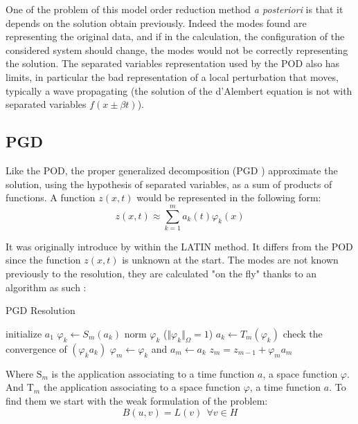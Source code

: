 \documentclass[12pt,a4paper]{article}
\begin{document}
One of the problem of this model order reduction method \textit{a posteriori} is that it depends on the solution obtain previously. Indeed the modes found are representing the original data, and if in the calculation, the configuration of the considered system should change, the modes would not be correctly representing the solution. The separated variables representation used by the POD also has limits, in particular the bad representation of a local perturbation that moves, typically a wave propagating (the solution of the d'Alembert equation is not with separated variables $f(x \pm \beta t )$).


\subsection{PGD}
Like the POD, the proper generalized decomposition (PGD \cite{Multidimensional}) approximate the solution, using the hypothesis of separated variables, as a sum of products of functions. A function $ z(x,t)$ would be represented in the following form:
\begin{equation}
z(x,t) \approx \sum^m_{k=1} a_k(t) \varphi_k(x)
\end{equation}

It was originally introduce by \cite{ladeveze1999nonlinear} within the LATIN method. It differs from the POD since the function $ z(x,t)$ is unknown at the start. The modes are not known previously to the resolution, they are calculated "on the fly" thanks to an algorithm as such :

\begin{center}
\begin{algorithm}
\caption{PGD Resolution}
\begin{algorithmic}[1]
\STATE initialize $a_1$
\STATE $\varphi_k \leftarrow S_m(a_k )$
\STATE norm $\varphi_k$ ($\Vert\varphi_k\Vert_\Omega = 1$)
\STATE $a_k \leftarrow T_m (\varphi_k )$
\STATE check the convergence of $(\varphi_k a_k)$
\ENDFOR
\STATE $\varphi_m \leftarrow \varphi_k$ and $a_m \leftarrow a_k$
\STATE $z_m = z_{m-1} + \varphi_m a_m$
\ENDFOR
\end{algorithmic}
\label{AlgoPGD}
\end{algorithm}
\label{AlgoPGDPartie}
\end{center}


Where $\text{S}_m$ is the application associating to a time function $a$, a space function $\varphi$. And $\text{T}_m$ the application associating to a space function $\varphi$, a time function $a$. To find them we start with the weak formulation of the problem:
\begin{equation}
\label{ProblemeLM}
B(u,v) = L(v) ~~ \forall v \in H
\end{equation}
\end{document}
